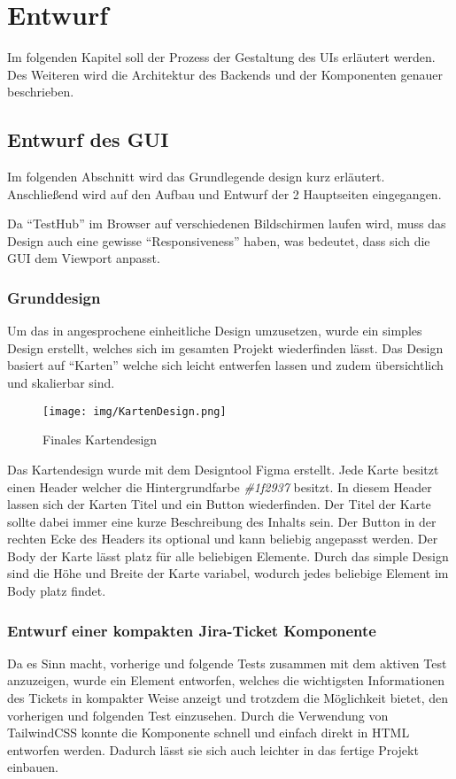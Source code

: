 \section{Entwurf}\label{sec:entwurd}
Im folgenden Kapitel soll der Prozess der Gestaltung des \gls{UI}s erläutert 
werden. Des Weiteren wird die Architektur des \gls{Backend}s und der Komponenten
genauer beschrieben.

\subsection{Entwurf des GUI}
Im folgenden Abschnitt wird das Grundlegende design kurz erläutert. Anschließend
wird auf den Aufbau und Entwurf der 2 Hauptseiten eingegangen. 

Da ``TestHub'' im Browser auf verschiedenen Bildschirmen laufen wird, muss das 
Design auch eine gewisse ``Responsiveness'' haben, was bedeutet, dass sich die 
GUI dem Viewport anpasst.

\subsubsection{Grunddesign}\label{sec:grunddesign}
Um das in  angesprochene einheitliche Design umzusetzen, 
wurde ein simples Design erstellt, welches sich im gesamten Projekt wiederfinden
lässt. Das Design basiert auf ``Karten'' welche sich leicht entwerfen lassen und
zudem übersichtlich und skalierbar sind.

\begin{figure}[H]
    \texttt{[image: img/KartenDesign.png]}
    \caption{Finales Kartendesign}\label{fig:card}
\end{figure}

Das Kartendesign wurde mit dem Designtool Figma erstellt. Jede Karte besitzt 
einen Header welcher die Hintergrundfarbe \textit{\#1f2937} besitzt. In diesem
Header lassen sich der Karten Titel und ein Button wiederfinden.
Der Titel der Karte sollte dabei immer eine kurze Beschreibung des Inhalts sein.
Der Button in der rechten Ecke des Headers its optional und kann beliebig 
angepasst werden. Der Body der Karte lässt platz für alle beliebigen Elemente.
Durch das simple Design sind die Höhe und Breite der Karte variabel, wodurch 
jedes beliebige Element im Body platz findet. 

\subsubsection{Entwurf einer kompakten Jira-Ticket Komponente}\label{sec:jirakompakt}
Da es Sinn macht, vorherige und folgende Tests zusammen mit dem aktiven Test 
anzuzeigen, wurde ein Element entworfen, welches die wichtigsten Informationen 
des Tickets in kompakter Weise anzeigt und trotzdem die Möglichkeit bietet, den 
vorherigen und folgenden Test einzusehen.
Durch die Verwendung von TailwindCSS konnte die Komponente schnell und einfach 
direkt in \gls{HTML} entworfen werden. Dadurch lässt sie sich auch leichter in
das fertige Projekt einbauen.


